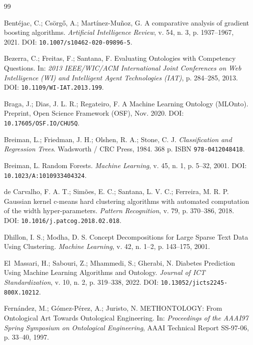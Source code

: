 \documentclass[11pt,a4paper]{article}
\begin{document}
\renewcommand{\refname}{7. REFERÊNCIAS BIBLIOGRÁFICAS}
{\sloppy
\begin{thebibliography}{99}\small

Bentéjac, C.; Csörgő, A.; Martínez-Muñoz, G. A comparative analysis of gradient boosting algorithms. \emph{Artificial Intelligence Review}, v. 54, n. 3, p. 1937--1967, 2021. DOI: \texttt{10.1007/s10462-020-09896-5}.

Bezerra, C.; Freitas, F.; Santana, F. Evaluating Ontologies with Competency Questions. In: \emph{2013 IEEE/WIC/ACM International Joint Conferences on Web Intelligence (WI) and Intelligent Agent Technologies (IAT)}, p. 284--285, 2013. DOI: \texttt{10.1109/WI-IAT.2013.199}.

Braga, J.; Dias, J. L. R.; Regateiro, F. A Machine Learning Ontology (MLOnto). Preprint, Open Science Framework (OSF), Nov. 2020. DOI: \texttt{10.17605/OSF.IO/CHU5Q}.

Breiman, L.; Friedman, J. H.; Olshen, R. A.; Stone, C. J. \emph{Classification and Regression Trees}. Wadsworth / CRC Press, 1984. 368 p. ISBN \texttt{978-0412048418}.

Breiman, L. Random Forests. \emph{Machine Learning}, v. 45, n. 1, p. 5--32, 2001. DOI: \texttt{10.1023/A:1010933404324}.

de Carvalho, F. A. T.; Simões, E. C.; Santana, L. V. C.; Ferreira, M. R. P. Gaussian kernel c-means hard clustering algorithms with automated computation of the width hyper-parameters. \emph{Pattern Recognition}, v. 79, p. 370--386, 2018. DOI: \texttt{10.1016/j.patcog.2018.02.018}.

Dhillon, I. S.; Modha, D. S. Concept Decompositions for Large Sparse Text Data Using Clustering. \emph{Machine Learning}, v. 42, n. 1--2, p. 143--175, 2001.

El~Massari, H.; Sabouri, Z.; Mhammedi, S.; Gherabi, N. Diabetes Prediction Using Machine Learning Algorithms and Ontology. \emph{Journal of ICT Standardization}, v. 10, n. 2, p. 319--338, 2022. DOI: \texttt{10.13052/jicts2245-800X.10212}.

Fernández, M.; Gómez-Pérez, A.; Juristo, N. METHONTOLOGY: From Ontological Art Towards Ontological Engineering. In: \emph{Proceedings of the AAAI97 Spring Symposium on Ontological Engineering}, AAAI Technical Report SS-97-06, p. 33--40, 1997.


\end{thebibliography}}
\end{document}

